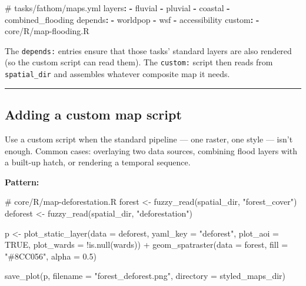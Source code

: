 \documentclass[
  letterpaper,
  DIV=11,
  numbers=noendperiod]{scrreprt}
\newenvironment{Shaded}{\begin{snugshade}}{\end{snugshade}}
\newcommand{\AttributeTok}[1]{\textcolor[rgb]{0.40,0.45,0.13}{#1}}
\newcommand{\CommentTok}[1]{\textcolor[rgb]{0.37,0.37,0.37}{#1}}
\newcommand{\ConstantTok}[1]{\textcolor[rgb]{0.56,0.35,0.01}{#1}}
\newcommand{\FloatTok}[1]{\textcolor[rgb]{0.68,0.00,0.00}{#1}}
\newcommand{\FunctionTok}[1]{\textcolor[rgb]{0.28,0.35,0.67}{#1}}
\newcommand{\KeywordTok}[1]{\textcolor[rgb]{0.00,0.23,0.31}{\textbf{#1}}}
\newcommand{\NormalTok}[1]{\textcolor[rgb]{0.00,0.23,0.31}{#1}}
\newcommand{\OtherTok}[1]{\textcolor[rgb]{0.00,0.23,0.31}{#1}}
\newcommand{\SpecialCharTok}[1]{\textcolor[rgb]{0.37,0.37,0.37}{#1}}
\newcommand{\StringTok}[1]{\textcolor[rgb]{0.13,0.47,0.30}{#1}}
\begin{document}
\begin{Shaded}
\begin{Highlighting}[]
\CommentTok{\# tasks/fathom/maps.yml}
\FunctionTok{layers}\KeywordTok{:}
\AttributeTok{  }\KeywordTok{{-}}\AttributeTok{ fluvial}
\AttributeTok{  }\KeywordTok{{-}}\AttributeTok{ pluvial}
\AttributeTok{  }\KeywordTok{{-}}\AttributeTok{ coastal}
\AttributeTok{  }\KeywordTok{{-}}\AttributeTok{ combined\_flooding}
\FunctionTok{depends}\KeywordTok{:}
\AttributeTok{  }\KeywordTok{{-}}\AttributeTok{ worldpop}
\AttributeTok{  }\KeywordTok{{-}}\AttributeTok{ wsf}
\AttributeTok{  }\KeywordTok{{-}}\AttributeTok{ accessibility}
\FunctionTok{custom}\KeywordTok{:}
\AttributeTok{  }\KeywordTok{{-}}\AttributeTok{ core/R/map{-}flooding.R}
\end{Highlighting}
\end{Shaded}

The \texttt{depends:} entries ensure that those tasks' standard layers
are also rendered (so the custom script can read them). The
\texttt{custom:} script then reads from \texttt{spatial\_dir} and
assembles whatever composite map it needs.

\begin{center}\rule{0.5\linewidth}{0.5pt}\end{center}

\subsection{Adding a custom map
script}\label{adding-a-custom-map-script}

Use a custom script when the standard pipeline --- one raster, one style
--- isn't enough. Common cases: overlaying two data sources, combining
flood layers with a built-up hatch, or rendering a temporal sequence.

\textbf{Pattern:}

\begin{Shaded}
\begin{Highlighting}[]
\CommentTok{\# core/R/map{-}deforestation.R}
\NormalTok{forest }\OtherTok{\textless{}{-}} \FunctionTok{fuzzy\_read}\NormalTok{(spatial\_dir, }\StringTok{"forest\_cover"}\NormalTok{)}
\NormalTok{deforest }\OtherTok{\textless{}{-}} \FunctionTok{fuzzy\_read}\NormalTok{(spatial\_dir, }\StringTok{"deforestation"}\NormalTok{)}

\NormalTok{p }\OtherTok{\textless{}{-}} \FunctionTok{plot\_static\_layer}\NormalTok{(}\AttributeTok{data =}\NormalTok{ deforest, }\AttributeTok{yaml\_key =} \StringTok{"deforest"}\NormalTok{,}
  \AttributeTok{plot\_aoi =} \ConstantTok{TRUE}\NormalTok{, }\AttributeTok{plot\_wards =} \SpecialCharTok{!}\FunctionTok{is.null}\NormalTok{(wards)) }\SpecialCharTok{+}
  \FunctionTok{geom\_spatraster}\NormalTok{(}\AttributeTok{data =}\NormalTok{ forest, }\AttributeTok{fill =} \StringTok{"\#8CC056"}\NormalTok{, }\AttributeTok{alpha =} \FloatTok{0.5}\NormalTok{)}

\FunctionTok{save\_plot}\NormalTok{(p, }\AttributeTok{filename =} \StringTok{"forest\_deforest.png"}\NormalTok{, }\AttributeTok{directory =}\NormalTok{ styled\_maps\_dir)}
\end{Highlighting}
\end{Shaded}
\end{document}
